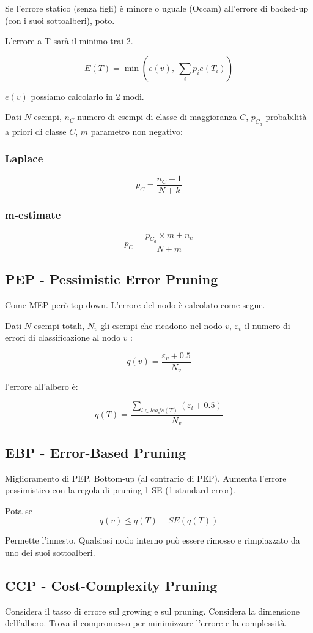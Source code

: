 \documentclass[11pt,onecolumn,a4paper,oneside]{book}
\begin{document}
Se l'errore statico (senza figli) è minore o uguale (Occam) all'errore di backed-up (con i suoi sottoalberi), poto.

L'errore a T sarà il minimo trai 2.

$$ E(T) = \min \left( e \left( v \right), ~ \sum_i p_i e \left( T_i \right) \right) $$

$e(v)$ possiamo calcolarlo in 2 modi.

Dati $N$ esempi, $n_C$ numero di esempi di classe di maggioranza $C$, $p_{C_a}$ probabilità a priori di classe $C$, $m$ parametro non negativo:

\subsubsection{Laplace}
$$ p_C = \frac{n_C +1}{N+k}$$

\subsubsection{m-estimate}
$$ p_C = \frac{p_{C_a} \times m + n_c}{N+m} $$


\subsection{PEP - Pessimistic Error Pruning}
Come MEP però top-down. L'errore del nodo è calcolato come segue.

Dati $N$ esempi totali, $N_v$ gli esempi che ricadono nel nodo $v$, $\varepsilon_v$ il numero di errori di classificazione al nodo $v$ :

$$ q(v) = \frac{\varepsilon_v + 0.5}{N_v}$$

l'errore all'albero è:

$$ q(T) = \frac{\sum_{l \in leafs(T)} \left( \varepsilon_l + 0.5 \right) }{N_v}$$

\subsection{EBP - Error-Based Pruning}
Miglioramento di PEP.
Bottom-up (al contrario di PEP). Aumenta l'errore pessimistico con la regola di pruning 1-SE (1 standard error).

Pota se $$q(v) \leq q(T) + SE \left( q(T) \right)$$

Permette l'innesto. Qualsiasi nodo interno può essere rimosso e rimpiazzato da uno dei suoi sottoalberi.


\subsection{CCP - Cost-Complexity Pruning}
Considera il tasso di errore sul growing e sul pruning. Considera la dimensione dell'albero. Trova il compromesso per minimizzare l'errore e la complessità.
\end{document}
